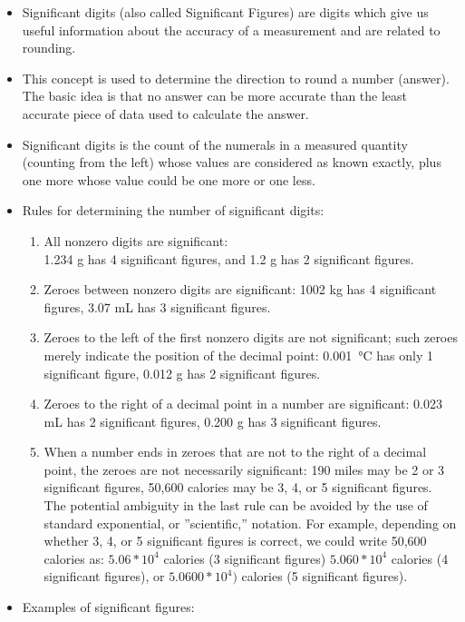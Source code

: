 \begin{itemize}
\item Significant digits (also called Significant Figures) are digits which give us useful information about the accuracy of a measurement and are related to rounding.
\item This concept is used to determine the direction to round a number (answer). The basic idea is that no answer can be more accurate than the least accurate piece of data used to calculate the answer.\\
\item Significant digits is the count of the numerals in a measured quantity (counting from the left) whose values are considered as known exactly, plus one more whose value could be one more or one less.\\
\item Rules for determining the number of significant digits:
\begin{enumerate}
\item All nonzero digits are significant:\\
1.234 g has 4 significant figures, and 1.2 g has 2 significant figures.
\item Zeroes between nonzero digits are significant:
1002 kg has 4 significant figures, 3.07 mL has 3 significant figures.
\item Zeroes to the left of the first nonzero digits are not significant; such zeroes merely indicate the position of the decimal point:
\SI{0.001}{\celsius} has only 1 significant figure, 0.012 g has 2 significant figures.
\item Zeroes to the right of a decimal point in a number are significant:
0.023 mL has 2 significant figures, 0.200 g has 3 significant figures.
\item When a number ends in zeroes that are not to the right of a decimal point, the zeroes are not necessarily significant:
190 miles may be 2 or 3 significant figures, 50,600 calories may be 3, 4, or 5 significant figures. The potential ambiguity in the last rule can be avoided by the use of standard exponential, or ”scientific,” notation. For example, depending on whether 3, 4, or 5 significant figures is correct, we could write 50,600 calories as: $5.06*10^4$ calories (3 significant figures) $5.060*10^4$ calories (4 significant figures), or
$5.0600*10^4)$ calories (5 significant figures).
\end{enumerate}
\item Examples of significant figures:

\end{itemize}
